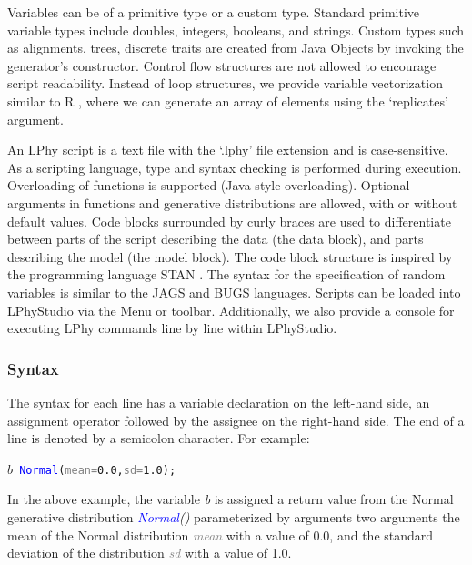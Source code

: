 \documentclass[10pt,letterpaper,table]{article}
\begin{document}
Variables can be of a primitive type or a custom type. 
Standard primitive variable types include doubles, integers, booleans, and strings. 
Custom types such as alignments, trees, discrete traits are created from Java Objects by invoking the generator's constructor. 
Control flow structures are not allowed to encourage script readability. 
Instead of loop structures, we provide variable vectorization similar to R \cite{ihaka1996r}, where we can generate an array of elements using the `replicates' argument. 

An LPhy script is a text file with the `.lphy' file extension and is case-sensitive. 
As a scripting language, type and syntax checking is performed during execution. 
Overloading of functions is supported (Java-style overloading). 
Optional arguments in functions and generative distributions are allowed, with or without default values. 
Code blocks surrounded by curly braces are used to differentiate between parts of the script describing the data (the data block), and parts describing the model (the model block). 
The code block structure is inspired by the programming language STAN \cite{carpenter2017stan}. 
The syntax for the specification of random variables is similar to the JAGS \cite{plummer2004jags} and BUGS \cite{lunn2009bugs, gilks1994language} languages. 
Scripts can be loaded into LPhyStudio via the Menu or toolbar. 
Additionally, we also provide a console for executing LPhy commands line by line within LPhyStudio. 

\subsubsection{Syntax}
The syntax for each line has a variable declaration on the left-hand side, an assignment operator followed by the assignee on the right-hand side. 
The end of a line is denoted by a semicolon character.
For example: 
{
  \small
  \begin{listing}
    \begin{alltt}
    \textcolor{bluishgreen}{\(b\)}  ~ \textcolor{blue}{Normal}(\textcolor{gray}{mean=} \textcolor{constant}{0.0}, \textcolor{gray}{sd=}\textcolor{constant}{1.0});
    \end{alltt}
  \end{listing}
}
In the above example, the variable \textit{\textcolor{bluishgreen}{b}} is assigned a return value from the Normal generative distribution \textit{\textcolor{blue}{Normal}()} parameterized by arguments two arguments the mean of the Normal distribution \textit{\textcolor{gray}{mean}} with a value of 0.0, and the standard deviation of the distribution \textit{\textcolor{gray}{sd}} with a value of 1.0.
\end{document}

